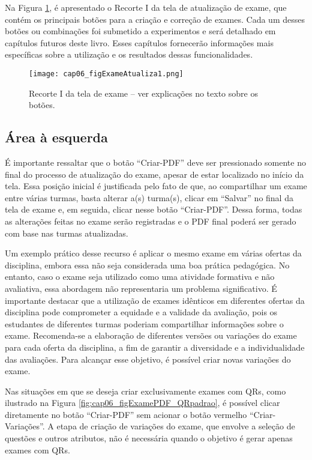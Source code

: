 Na Figura \ref{fig:cap06_figExameAtualiza1}, é apresentado o Recorte I da tela de atualização de exame, que contém os principais botões para a criação e correção de exames. Cada um desses botões ou combinações foi submetido a experimentos e será detalhado em capítulos futuros deste livro. Esses capítulos fornecerão informações mais específicas sobre a utilização e os resultados dessas funcionalidades.

\begin{figure}[!t]
  \centering
  \texttt{[image: cap06\_figExameAtualiza1.png]}
  \caption{Recorte I da tela de exame -- ver explicações no texto sobre os botões.}
  \label{fig:cap06_figExameAtualiza1}\vspace{-3mm}
\end{figure}

\subsection{Área à esquerda}\label{sec:areaEsquerda}

É importante ressaltar que o botão ``Criar-PDF'' deve ser pressionado somente no final do processo de atualização do exame, apesar de estar localizado no início da tela. Essa posição inicial é justificada pelo fato de que, ao compartilhar um exame entre várias turmas, basta alterar a(s) turma(s), clicar em ``Salvar'' no final da tela de exame e, em seguida, clicar nesse botão ``Criar-PDF''. Dessa forma, todas as alterações feitas no exame serão registradas e o PDF final poderá ser gerado com base nas turmas atualizadas. 

Um exemplo prático desse recurso é aplicar o mesmo exame em várias ofertas da disciplina, embora essa não seja considerada uma boa prática pedagógica. No entanto, caso o exame seja utilizado como uma atividade formativa e não avaliativa, essa abordagem não representaria um problema significativo. É importante destacar que a utilização de exames idênticos em diferentes ofertas da disciplina pode comprometer a equidade e a validade da avaliação, pois os estudantes de diferentes turmas poderiam compartilhar informações sobre o exame. Recomenda-se a elaboração de diferentes versões ou variações do exame para cada oferta da disciplina, a fim de garantir a diversidade e a individualidade das avaliações. Para alcançar esse objetivo, é possível criar novas variações do exame.

Nas situações em que se deseja criar exclusivamente exames com QRs, como ilustrado na Figura \ref{fig:cap06_figExamePDF_QRpadrao}, é possível clicar diretamente no botão ``Criar-PDF'' sem acionar o botão vermelho ``Criar-Variações''. A etapa de criação de variações do exame, que envolve a seleção de questões e outros atributos, não é necessária quando o objetivo é gerar apenas exames com QRs.

